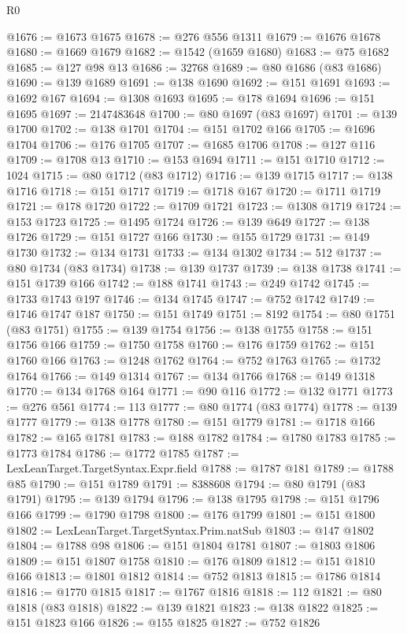 \begin{lexlean}{R0}
\begin{coremodule}
@1676 := @1673 @1675
@1678 := @276 @556 @1311
@1679 := @1676 @1678
@1680 := @1669 @1679
@1682 := @1542 (@1659 @1680)
@1683 := @75 @1682
@1685 := @127 @98 @13
@1686 := 32768
@1689 := @80 @1686 (@83 @1686)
@1690 := @139 @1689
@1691 := @138 @1690
@1692 := @151 @1691
@1693 := @1692 @167
@1694 := @1308 @1693
@1695 := @178 @1694
@1696 := @151 @1695
@1697 := 2147483648
@1700 := @80 @1697 (@83 @1697)
@1701 := @139 @1700
@1702 := @138 @1701
@1704 := @151 @1702 @166
@1705 := @1696 @1704
@1706 := @176 @1705
@1707 := @1685 @1706
@1708 := @127 @116
@1709 := @1708 @13
@1710 := @153 @1694
@1711 := @151 @1710
@1712 := 1024
@1715 := @80 @1712 (@83 @1712)
@1716 := @139 @1715
@1717 := @138 @1716
@1718 := @151 @1717
@1719 := @1718 @167
@1720 := @1711 @1719
@1721 := @178 @1720
@1722 := @1709 @1721
@1723 := @1308 @1719
@1724 := @153 @1723
@1725 := @1495 @1724
@1726 := @139 @649
@1727 := @138 @1726
@1729 := @151 @1727 @166
@1730 := @155 @1729
@1731 := @149 @1730
@1732 := @134 @1731
@1733 := @134 @1302
@1734 := 512
@1737 := @80 @1734 (@83 @1734)
@1738 := @139 @1737
@1739 := @138 @1738
@1741 := @151 @1739 @166
@1742 := @188 @1741
@1743 := @249 @1742
@1745 := @1733 @1743 @197
@1746 := @134 @1745
@1747 := @752 @1742
@1749 := @1746 @1747 @187
@1750 := @151 @1749
@1751 := 8192
@1754 := @80 @1751 (@83 @1751)
@1755 := @139 @1754
@1756 := @138 @1755
@1758 := @151 @1756 @166
@1759 := @1750 @1758
@1760 := @176 @1759
@1762 := @151 @1760 @166
@1763 := @1248 @1762
@1764 := @752 @1763
@1765 := @1732 @1764
@1766 := @149 @1314
@1767 := @134 @1766
@1768 := @149 @1318
@1770 := @134 @1768 @164
@1771 := @90 @116
@1772 := @132 @1771
@1773 := @276 @561
@1774 := 113
@1777 := @80 @1774 (@83 @1774)
@1778 := @139 @1777
@1779 := @138 @1778
@1780 := @151 @1779
@1781 := @1718 @166
@1782 := @165 @1781
@1783 := @188 @1782
@1784 := @1780 @1783
@1785 := @1773 @1784
@1786 := @1772 @1785
@1787 := LexLeanTarget.TargetSyntax.Expr.field
@1788 := @1787 @181
@1789 := @1788 @85
@1790 := @151 @1789
@1791 := 8388608
@1794 := @80 @1791 (@83 @1791)
@1795 := @139 @1794
@1796 := @138 @1795
@1798 := @151 @1796 @166
@1799 := @1790 @1798
@1800 := @176 @1799
@1801 := @151 @1800
@1802 := LexLeanTarget.TargetSyntax.Prim.natSub
@1803 := @147 @1802
@1804 := @1788 @98
@1806 := @151 @1804 @1781
@1807 := @1803 @1806
@1809 := @151 @1807 @1758
@1810 := @176 @1809
@1812 := @151 @1810 @166
@1813 := @1801 @1812
@1814 := @752 @1813
@1815 := @1786 @1814
@1816 := @1770 @1815
@1817 := @1767 @1816
@1818 := 112
@1821 := @80 @1818 (@83 @1818)
@1822 := @139 @1821
@1823 := @138 @1822
@1825 := @151 @1823 @166
@1826 := @155 @1825
@1827 := @752 @1826

\end{coremodule}
\end{lexlean}
